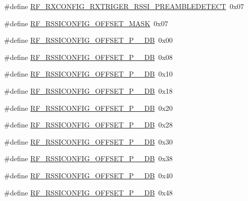 \begin{DoxyCompactItemize}
\item 
\#define \mbox{\hyperlink{sx1276_regs-_fsk_8h_ac0fb8096e173b7862b65d689a21a8d57}{R\+F\+\_\+\+R\+X\+C\+O\+N\+F\+I\+G\+\_\+\+R\+X\+T\+R\+I\+G\+E\+R\+\_\+\+R\+S\+S\+I\+\_\+\+P\+R\+E\+A\+M\+B\+L\+E\+D\+E\+T\+E\+CT}}~0x07
\item 
\#define \mbox{\hyperlink{sx1276_regs-_fsk_8h_a699dac31bce270b1076bcf3026d007db}{R\+F\+\_\+\+R\+S\+S\+I\+C\+O\+N\+F\+I\+G\+\_\+\+O\+F\+F\+S\+E\+T\+\_\+\+M\+A\+SK}}~0x07
\item 
\#define \mbox{\hyperlink{sx1276_regs-_fsk_8h_aa354cb5789ab8e09067569f67a359440}{R\+F\+\_\+\+R\+S\+S\+I\+C\+O\+N\+F\+I\+G\+\_\+\+O\+F\+F\+S\+E\+T\+\_\+\+P\+\_\+\_\+\+DB}}~0x00
\item 
\#define \mbox{\hyperlink{sx1276_regs-_fsk_8h_a0a3e7708d76f93e58d8edd106f1a2276}{R\+F\+\_\+\+R\+S\+S\+I\+C\+O\+N\+F\+I\+G\+\_\+\+O\+F\+F\+S\+E\+T\+\_\+\+P\+\_\+\_\+\+DB}}~0x08
\item 
\#define \mbox{\hyperlink{sx1276_regs-_fsk_8h_a353ff92327056e55a727979d6a82e27a}{R\+F\+\_\+\+R\+S\+S\+I\+C\+O\+N\+F\+I\+G\+\_\+\+O\+F\+F\+S\+E\+T\+\_\+\+P\+\_\+\_\+\+DB}}~0x10
\item 
\#define \mbox{\hyperlink{sx1276_regs-_fsk_8h_a94023f7a527573099d0c794d75c9d808}{R\+F\+\_\+\+R\+S\+S\+I\+C\+O\+N\+F\+I\+G\+\_\+\+O\+F\+F\+S\+E\+T\+\_\+\+P\+\_\+\_\+\+DB}}~0x18
\item 
\#define \mbox{\hyperlink{sx1276_regs-_fsk_8h_aea0ec0438ba56a524841136e5237f4ad}{R\+F\+\_\+\+R\+S\+S\+I\+C\+O\+N\+F\+I\+G\+\_\+\+O\+F\+F\+S\+E\+T\+\_\+\+P\+\_\+\_\+\+DB}}~0x20
\item 
\#define \mbox{\hyperlink{sx1276_regs-_fsk_8h_a3c460ec9034b813510375d7c2e111141}{R\+F\+\_\+\+R\+S\+S\+I\+C\+O\+N\+F\+I\+G\+\_\+\+O\+F\+F\+S\+E\+T\+\_\+\+P\+\_\+\_\+\+DB}}~0x28
\item 
\#define \mbox{\hyperlink{sx1276_regs-_fsk_8h_a71cb3712a518504dc00192bd7830d0fc}{R\+F\+\_\+\+R\+S\+S\+I\+C\+O\+N\+F\+I\+G\+\_\+\+O\+F\+F\+S\+E\+T\+\_\+\+P\+\_\+\_\+\+DB}}~0x30
\item 
\#define \mbox{\hyperlink{sx1276_regs-_fsk_8h_a2e7c3aaf7c9271cab8f33ffb42d016ac}{R\+F\+\_\+\+R\+S\+S\+I\+C\+O\+N\+F\+I\+G\+\_\+\+O\+F\+F\+S\+E\+T\+\_\+\+P\+\_\+\_\+\+DB}}~0x38
\item 
\#define \mbox{\hyperlink{sx1276_regs-_fsk_8h_a523fcb82c45be7b2f269a9c20c5063e3}{R\+F\+\_\+\+R\+S\+S\+I\+C\+O\+N\+F\+I\+G\+\_\+\+O\+F\+F\+S\+E\+T\+\_\+\+P\+\_\+\_\+\+DB}}~0x40
\item 
\#define \mbox{\hyperlink{sx1276_regs-_fsk_8h_a070ede192c6134e05ce21875038d2525}{R\+F\+\_\+\+R\+S\+S\+I\+C\+O\+N\+F\+I\+G\+\_\+\+O\+F\+F\+S\+E\+T\+\_\+\+P\+\_\+\_\+\+DB}}~0x48

\end{DoxyCompactItemize}
